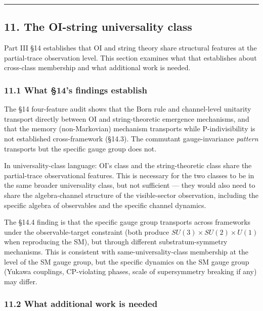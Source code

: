 \documentclass[
]{article}
\begin{document}
\begin{center}\rule{0.5\linewidth}{0.5pt}\end{center}

\hypertarget{the-oi-string-universality-class}{%
\subsection{11. The OI-string universality
class}\label{the-oi-string-universality-class}}

Part III §14 establishes that OI and string theory share structural
features at the partial-trace observation level. This section examines
what that establishes about cross-class membership and what additional
work is needed.

\hypertarget{what-14s-findings-establish}{%
\subsubsection{11.1 What §14's findings
establish}\label{what-14s-findings-establish}}

The §14 four-feature audit shows that the Born rule and channel-level
unitarity transport directly between OI and string-theoretic emergence
mechanisms, and that the memory (non-Markovian) mechanism transports
while P-indivisibility is not established cross-framework (§14.3). The
commutant gauge-invariance \emph{pattern} transports but the specific
gauge group does not.

In universality-class language: OI's class and the string-theoretic
class share the partial-trace observational features. This is necessary
for the two classes to be in the same broader universality class, but
not sufficient --- they would also need to share the algebra-channel
structure of the visible-sector observation, including the specific
algebra of observables and the specific channel dynamics.

The §14.4 finding is that the specific gauge group transports across
frameworks under the observable-target constraint (both produce
\(SU(3) \times SU(2) \times U(1)\) when reproducing the SM), but through
different substratum-symmetry mechanisms. This is consistent with
same-universality-class membership at the level of the SM gauge group,
but the specific dynamics on the SM gauge group (Yukawa couplings,
CP-violating phases, scale of supersymmetry breaking if any) may differ.

\hypertarget{what-additional-work-is-needed}{%
\subsubsection{11.2 What additional work is
needed}\label{what-additional-work-is-needed}}
\end{document}
